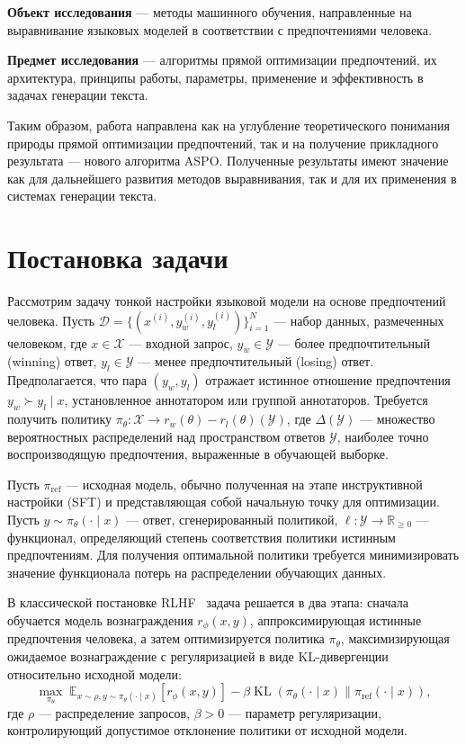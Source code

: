 \documentclass[a4paper,12pt]{article}
\begin{document}
\noindent\textbf{Объект исследования} — методы машинного обучения, направленные на выравнивание языковых моделей в соответствии с предпочтениями человека.

\noindent\textbf{Предмет исследования} — алгоритмы прямой оптимизации предпочтений, их архитектура, принципы работы, параметры, применение и эффективность в задачах генерации текста.

Таким образом, работа направлена как на углубление теоретического понимания природы прямой оптимизации предпочтений, так и на получение прикладного результата — нового алгоритма ASPO. Полученные результаты имеют значение как для дальнейшего развития методов выравнивания, так и для их применения в системах генерации текста.

\section{Постановка задачи}

Рассмотрим задачу тонкой настройки языковой модели на основе предпочтений человека. Пусть $\mathcal{D} = \{(x^{(i)}, y_w^{(i)}, y_l^{(i)})\}_{i=1}^N$ — набор данных, размеченных человеком, где $x \in \mathcal{X}$ — входной запрос, $y_w \in \mathcal{Y}$ — более предпочтительный (winning) ответ, $y_l \in \mathcal{Y}$ — менее предпочтительный (losing) ответ. Предполагается, что пара $(y_w, y_l)$ отражает истинное отношение предпочтения $y_w \succ y_l \mid x$, установленное аннотатором или группой аннотаторов. Требуется получить политику $\pi_\theta: \mathcal{X} \to r_w(\theta) - r_l(\theta)(\mathcal{Y})$, где $\Delta(\mathcal{Y})$ — множество вероятностных распределений над пространством ответов $\mathcal{Y}$, наиболее точно воспроизводящую предпочтения, выраженные в обучающей выборке.

Пусть $\pi_{\text{ref}}$ — исходная модель, обычно полученная на этапе инструктивной настройки (SFT) и представляющая собой начальную точку для оптимизации. Пусть ${y} \sim \pi_\theta(\cdot \mid x)$ — ответ, сгенерированный политикой, $\ell: \mathcal{Y} \to \mathbb{R}_{\geq 0}$ — функционал, определяющий степень соответствия политики истинным предпочтениям. Для получения оптимальной политики требуется минимизировать значение функционала потерь на распределении обучающих данных.

В классической постановке RLHF~\cite{ouyang2022training} задача решается в два этапа: сначала обучается модель вознаграждения $r_\phi(x, y)$, аппроксимирующая истинные предпочтения человека, а затем оптимизируется политика $\pi_\theta$, максимизирующая ожидаемое вознаграждение с регуляризацией в виде KL-дивергенции относительно исходной модели:
\[
\max_{\pi_\theta} \; \mathbb{E}_{x \sim \rho, y \sim \pi_\theta(\cdot \mid x)} [r_\phi(x, y)] - \beta \operatorname{KL}(\pi_\theta(\cdot \mid x) \| \pi_{\text{ref}}(\cdot \mid x)),
\]
где $\rho$ — распределение запросов, $\beta > 0$ — параметр регуляризации, контролирующий допустимое отклонение политики от исходной модели.
\end{document}

